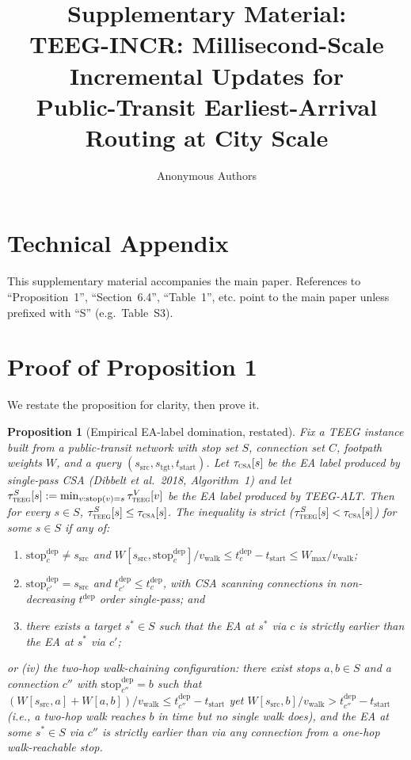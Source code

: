\documentclass[letterpaper]{article}
\title{Supplementary Material:\\
TEEG-INCR: Millisecond-Scale Incremental Updates for\\
Public-Transit Earliest-Arrival Routing at City Scale}
\author{Anonymous Authors}
\newtheorem{proposition}{Proposition}
\begin{document}
\maketitle

\section*{Technical Appendix}
\setcounter{section}{0}
\setcounter{theorem}{0}
\setcounter{table}{0}
\renewcommand{\thesection}{\Alph{section}}
\renewcommand{\thetable}{S\arabic{table}}

This supplementary material accompanies the main paper. References to
``Proposition~1'', ``Section~6.4'', ``Table~1'', etc. point to the main
paper unless prefixed with ``S'' (e.g.\ Table~S3).

\section{Proof of Proposition 1}
\label{app:proof}

We restate the proposition for clarity, then prove it.

\begin{proposition}[Empirical EA-label domination, restated]
Fix a TEEG instance built from a public-transit network with stop set
$S$, connection set $C$, footpath weights $W$, and a query
$(s_\text{src}, s_\text{tgt}, t_\text{start})$. Let $\tau_\textsc{csa}[s]$
be the EA label produced by single-pass CSA (Dibbelt et al.\ 2018,
Algorithm~1) and let $\tau^S_\textsc{teeg}[s] := \min_{v: \text{stop}(v) = s}
\tau^V_\textsc{teeg}[v]$ be the EA label produced by TEEG-ALT. Then for
every $s \in S$, $\tau^S_\textsc{teeg}[s] \leq \tau_\textsc{csa}[s]$.
The inequality is \emph{strict} ($\tau^S_\textsc{teeg}[s] <
\tau_\textsc{csa}[s]$) for some $s \in S$ if any of:
\begin{enumerate}
\item[(i)] $\text{stop}^\text{dep}_c \neq s_\text{src}$ and
$W[s_\text{src}, \text{stop}^\text{dep}_c] / v_\text{walk} \leq
t^\text{dep}_c - t_\text{start} \leq W_\text{max}/v_\text{walk}$;
\item[(ii)] $\text{stop}^\text{dep}_{c'} = s_\text{src}$ and
$t^\text{dep}_{c'} \leq t^\text{dep}_c$, with CSA scanning
connections in non-decreasing $t^\text{dep}$ order single-pass; and
\item[(iii)] there exists a target $s^* \in S$ such that the EA at
$s^*$ via $c$ is strictly earlier than the EA at $s^*$ via $c'$;
\end{enumerate}
\emph{or} (iv) the two-hop walk-chaining configuration:
there exist stops $a, b \in S$ and a connection $c''$ with
$\text{stop}^\text{dep}_{c''} = b$ such that
$(W[s_\text{src}, a] + W[a, b]) / v_\text{walk} \leq
t^\text{dep}_{c''} - t_\text{start}$
yet $W[s_\text{src}, b] / v_\text{walk} > t^\text{dep}_{c''} -
t_\text{start}$ (i.e., a two-hop walk reaches $b$ in time but no
single walk does), and the EA at some $s^* \in S$ via $c''$ is
strictly earlier than via any connection from a one-hop walk-reachable
stop.
\end{proposition}
\end{document}
